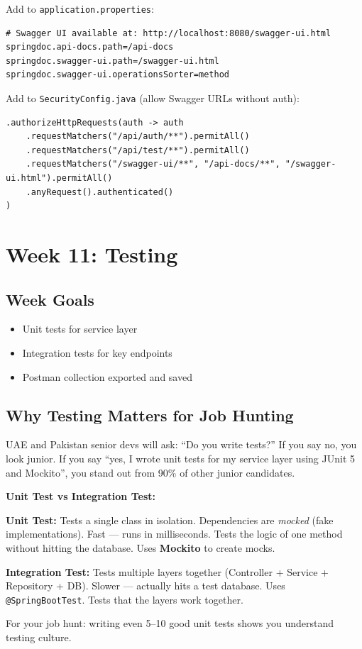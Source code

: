 \documentclass[12pt,a4paper]{report}
\newcommand{\code}[1]{\texttt{\textcolor{keywordblue}{#1}}}
\newcommand{\file}[1]{\texttt{\textcolor{successgreen}{#1}}}
\begin{document}
Add to \file{application.properties}:
\begin{lstlisting}[style=xmlstyle]
# Swagger UI available at: http://localhost:8080/swagger-ui.html
springdoc.api-docs.path=/api-docs
springdoc.swagger-ui.path=/swagger-ui.html
springdoc.swagger-ui.operationsSorter=method
\end{lstlisting}

Add to \file{SecurityConfig.java} (allow Swagger URLs without auth):
\begin{lstlisting}[caption=Allow Swagger in SecurityConfig]
.authorizeHttpRequests(auth -> auth
    .requestMatchers("/api/auth/**").permitAll()
    .requestMatchers("/api/test/**").permitAll()
    .requestMatchers("/swagger-ui/**", "/api-docs/**", "/swagger-ui.html").permitAll()
    .anyRequest().authenticated()
)
\end{lstlisting}

\chapter{Week 11: Testing}

\section{Week Goals}

\begin{itemize}
  \item Unit tests for service layer
  \item Integration tests for key endpoints
  \item Postman collection exported and saved
\end{itemize}

\section{Why Testing Matters for Job Hunting}

UAE and Pakistan senior devs will ask: ``Do you write tests?'' If you say no, you look junior. If you say ``yes, I wrote unit tests for my service layer using JUnit 5 and Mockito'', you stand out from 90\% of other junior candidates.

\begin{tcolorbox}[notebox]
\textbf{Unit Test vs Integration Test:}

\textbf{Unit Test:} Tests a single class in isolation. Dependencies are \textit{mocked} (fake implementations). Fast --- runs in milliseconds. Tests the logic of one method without hitting the database. Uses \textbf{Mockito} to create mocks.

\textbf{Integration Test:} Tests multiple layers together (Controller + Service + Repository + DB). Slower --- actually hits a test database. Uses \code{@SpringBootTest}. Tests that the layers work together.

For your job hunt: writing even 5--10 good unit tests shows you understand testing culture.
\end{tcolorbox}
\end{document}

